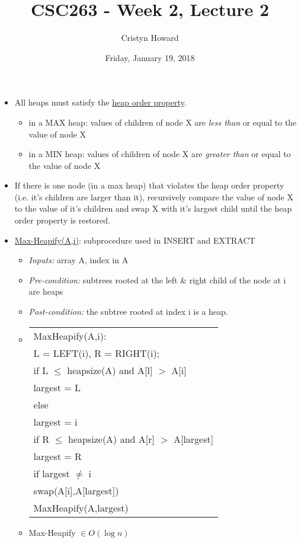\documentclass[12pt]{article}
\title{CSC263 - Week 2, Lecture 2}
\author{Cristyn Howard}
\date{Friday, January 19, 2018}
\newcommand\tab[1][0.5cm]{\hspace*{#1}}
\begin{document}
\maketitle

\begin{itemize}
\item All heaps must satisfy the \underline{heap order property}.
	\begin{itemize}
	\item in a MAX heap:	\tab values of children of node X are \emph{less than} or equal to the value of node X
	\item in a MIN heap: \tab values of children of node X are \emph{greater than} or equal to the value of node X
	\end{itemize}

\item If there is one node (in a max heap) that violates the heap order property (i.e. it's children are larger than it), recursively compare the value of node X to the value of it's children and swap X with it's largest child until the heap order property is restored.

\item \underline{Max-Heapify(A,i)}: subprocedure used in INSERT and EXTRACT
	\begin{itemize}
	\item \emph{Inputs:} array A, index in A
	\item \emph{Pre-condition:} subtrees rooted at the left $\&$ right child of the node at i are heaps
	\item \emph{Post-condition:} the subtree rooted at index i is a heap.
	\item  \begin{tabular}{|l|}
		\hline
		MaxHeapify(A,i): \\
 		L = LEFT(i), R = RIGHT(i); \\
 		if L $\leq$ heapsize(A) and A[l] $>$ A[i] \\
    		\tab	 largest = L \\
    		else \\
		\tab largest = i \\
		 if R $\leq$ heapsize(A) and A[r] $>$ A[largest] \\
     		\tab	largest = R \\
 		if largest $\neq$ i \\
    		\tab swap(A[i],A[largest]) \\
         	\tab	MaxHeapify(A,largest) \\
		\hline
		\end{tabular}
	\item Max-Heapify $\in O(\log{n})$
	\end{itemize}


\end{itemize}
\end{document}
